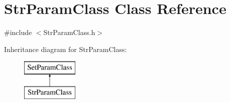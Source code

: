 \hypertarget{class_str_param_class}{}\section{Str\+Param\+Class Class Reference}
\label{class_str_param_class}


{\ttfamily \#include $<$Str\+Param\+Class.\+h$>$}

Inheritance diagram for Str\+Param\+Class\+:\begin{figure}[H]
\begin{center}
\leavevmode
\includegraphics[height=2.000000cm]{class_str_param_class}
\end{center}
\end{figure}
